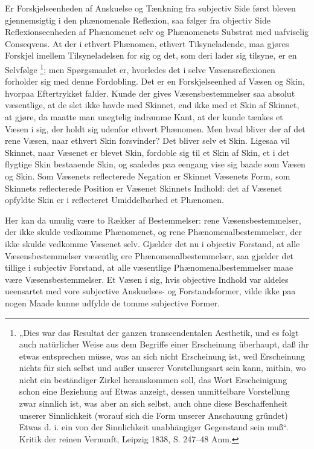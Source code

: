 \documentclass[11pt]{book}
\newcommand{\opage}[1]{\marginnote{\footnotesize\textit{[#1]}}}
\begin{document}
Er Forskjelseenheden af Anskuelse og Tænkning fra subjectiv Side først bleven gjennemsigtig i den phænomenale Reflexion, saa følger fra objectiv Side Reflexionseenheden af Phænomenet selv og Phænomenets Substrat med uafviselig Conseqvens. At der i ethvert Phænomen, ethvert Tilsyneladende, maa gjøres Forskjel imellem Tilsyneladelsen for sig og det, som deri lader sig tilsyne, er en Selvfølge%
\footnote{„Dies war das Resultat der ganzen transcendentalen Aesthetik, und es folgt auch natürlicher Weise aus dem Begriffe einer Erscheinung überhaupt, daß ihr etwas entsprechen müsse, was an sich nicht Erscheinung ist, weil Erscheinung nichts für sich selbst und außer unserer Vorstellungsart sein kann, mithin, wo nicht ein beständiger Zirkel herauskommen soll, das Wort Erscheinigung schon eine Beziehung auf Etwas anzeigt, dessen unmittelbare Vorstellung zwar sinnlich ist, was aber an sich selbst, auch ohne diese Beschaffenheit unserer Sinnlichkeit (worauf sich die Form unserer Anschauung gründet) Etwas d. i. ein von der Sinnlichkeit unabhängiger Gegenstand sein muß“. Kritik der reinen Vernunft, Leipzig 1838, S. 247--48 Anm.}; men
\opage{79} \setcounter{footnote}{0}%
Spørgsmaalet er, hvorledes det i selve Væsensreflexionen forholder sig med denne Fordobling. Det er en Forskjelseenhed af Væsen og Skin, hvorpaa Eftertrykket falder. Kunde der gives Væsensbestemmelser saa absolut væsentlige, at de slet ikke havde med Skinnet, end ikke med et Skin af Skinnet, at gjøre, da maatte man unegtelig indrømme Kant, at der kunde tænkes et Væsen i sig, der holdt sig udenfor ethvert Phænomen. Men hvad bliver der af det rene Væsen, naar ethvert Skin forsvinder? Det bliver selv et Skin. Ligesaa vil Skinnet, naar Væsenet er blevet Skin, fordoble sig til et Skin af Skin, et i det flygtige Skin bestaaende Skin, og saaledes paa eengang vise sig baade som Væsen og Skin. Som Væsenets reflecterede Negation er Skinnet Væsenets Form, som Skinnets reflecterede Position er Væsenet Skinnets Indhold: det af Væsenet opfyldte Skin er i reflecteret Umiddelbarhed et Phænomen.

Her kan da umulig være to Rækker af Bestemmelser: rene Væsensbestemmelser, der ikke skulde vedkomme Phænomenet, og rene Phænomenalbestemmelser, der ikke skulde vedkomme Væsenet selv. Gjælder det nu i objectiv Forstand, at alle Væsensbestemmelser væsentlig ere Phænomenalbestemmelser, saa gjælder det tillige i subjectiv Forstand, at alle væsentlige Phænomenalbestemmelser maae være Væsensbestemmelser. Et Væsen i sig, hvis objective Indhold var aldeles ueensartet med vore subjective Anskuelses- og Forstandsformer, vilde
\opage{80} \setcounter{footnote}{0}%
ikke paa nogen Maade kunne udfylde de tomme subjective Former.
\end{document}
